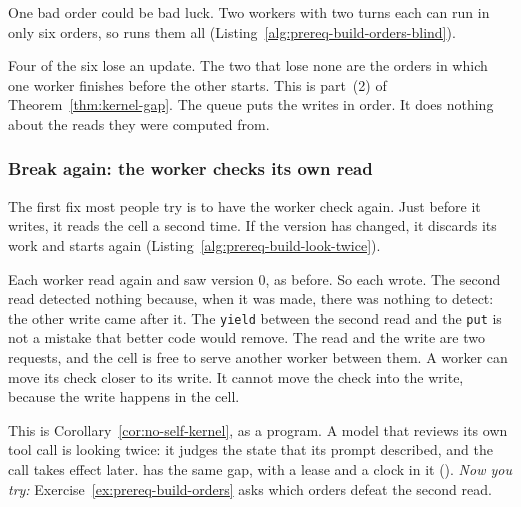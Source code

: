 One bad order could be bad luck. Two workers with two turns each can run in
only six orders, so \pdkernelname{} runs them all
(Listing~\ref{alg:prereq-build-orders-blind}).


Four of the six lose an update. The two that lose none are the orders in
which one worker finishes before the other starts. This is part~(2) of
Theorem~\ref{thm:kernel-gap}. The queue puts the writes in order. It does
nothing about the reads they were computed from.

\subsubsection{Break again: the worker checks its own read}

The first fix most people try is to have the worker check again. Just
before it writes, it reads the cell a second time. If the version has
changed, it discards its work and starts again
(Listing~\ref{alg:prereq-build-look-twice}).



Each worker read again and saw version 0, as before. So each wrote. The
second read detected nothing because, when it was made, there was nothing
to detect: the other write came after it. The \texttt{yield} between the
second read and the \texttt{put} is not a mistake that better code would
remove. The read and the write are two requests, and the cell is free to
serve another worker between them. A worker can move its check closer to
its write. It cannot move the check into the write, because the write
happens in the cell.

This is Corollary~\ref{cor:no-self-kernel}, as a program. A model that
reviews its own tool call is looking twice: it judges the state that its
prompt described, and the call takes effect later.
 has the same gap, with a lease and a clock in
it (). \emph{Now you try:}
Exercise~\ref{ex:prereq-build-orders} asks which orders defeat the second
read.

